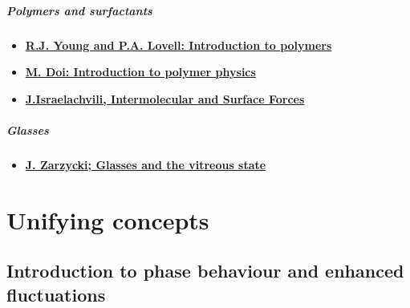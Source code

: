 \documentclass[
  letterpaper,
  DIV=11,
  numbers=noendperiod]{scrreprt}
\providecommand{\tightlist}{%
  \setlength{\itemsep}{0pt}\setlength{\parskip}{0pt}}
\begin{document}
\subsubsection*{Polymers and
surfactants}\label{polymers-and-surfactants}

\begin{itemize}
\item
  \textbf{\href{https://bris.on.worldcat.org/search/detail/744914764?queryString=introduction\%20to\%20polymers&clusterResults=true&stickyFacetsChecked=true&groupVariantRecords=false&newsArticles=off&bookReviews=off}{R.J.
  Young and P.A. Lovell: Introduction to polymers}}
\item
  \textbf{\href{https://bris.on.worldcat.org/search/detail/32465842?queryString=introduction\%20to\%20polymer\%20physics&clusterResults=true&stickyFacetsChecked=true&groupVariantRecords=false&newsArticles=off&bookReviews=off}{M.
  Doi: Introduction to polymer physics}}
\item
  \textbf{\href{https://bris.on.worldcat.org/search/detail/961357167?queryString=\%20Intermolecular\%20and\%20Surface\%20Forces&clusterResults=true&stickyFacetsChecked=true&groupVariantRecords=false&newsArticles=off&bookReviews=off}{J.Israelachvili,
  Intermolecular and Surface Forces}}
\end{itemize}

\subsubsection*{Glasses}\label{glasses}

\begin{itemize}
\tightlist
\item
  \textbf{\href{https://bris.on.worldcat.org/search/detail/21975348?queryString=Glasses\%20and\%20the\%20vitreous\%20state&clusterResults=true&stickyFacetsChecked=true&groupVariantRecords=false&newsArticles=off&bookReviews=off}{J.
  Zarzycki; Glasses and the vitreous state}}
\end{itemize}

\part{Unifying concepts}

\chapter{Introduction to phase behaviour and enhanced
fluctuations}\label{introduction-to-phase-behaviour-and-enhanced-fluctuations}
\end{document}
